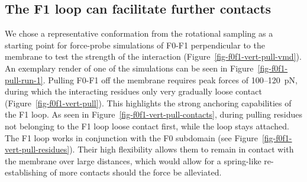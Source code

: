 \documentclass[
  letterpaper,
  DIV=11,
  numbers=noendperiod]{scrartcl}
\begin{document}
\begin{figure}
\end{figure}

\hypertarget{the-f1-loop-can-facilitate-further-contacts}{%
\subsection{The F1 loop can facilitate further
contacts}\label{the-f1-loop-can-facilitate-further-contacts}}

We chose a representative conformation from the rotational sampling as a
starting point for force-probe simulations of F0-F1 perpendicular to the
membrane to test the strength of the interaction
(Figure~\ref{fig-f0f1-vert-pull-vmd}). An exemplary render of one of the
simulations can be seen in Figure~\ref{fig-f0f1-pull-run-1}. Pulling
F0-F1 off the membrane requires peak forces of 100--120~pN, during which
the interacting residues only very gradually loose contact
(Figure~\ref{fig-f0f1-vert-pull}). This highlights the strong anchoring
capabilities of the F1 loop. As seen in
Figure~\ref{fig-f0f1-vert-pull-contacts}, during pulling residues not
belonging to the F1 loop loose contact first, while the loop stays
attached. The F1 loop works in conjunction with the F0 subdomain (see
Figure~\ref{fig-f0f1-vert-pull-residues}). Their high flexibility allows
them to remain in contact with the membrane over large distances, which
would allow for a spring-like re-establishing of more contacts should
the force be alleviated.
\end{document}
